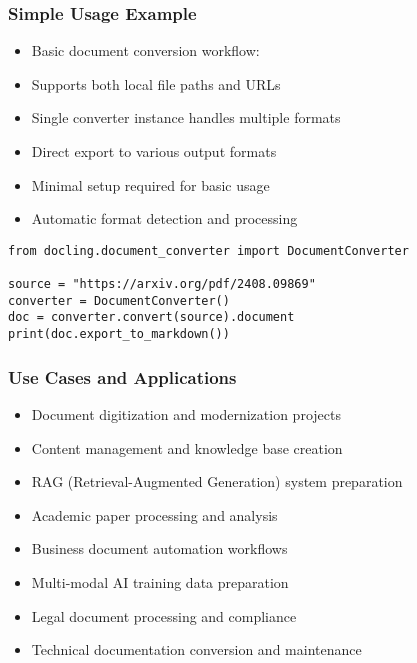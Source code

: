 \begin{frame}[fragile]\frametitle{Simple Usage Example}
      \begin{itemize}
	\item Basic document conversion workflow:
	\item Supports both local file paths and URLs
	\item Single converter instance handles multiple formats
	\item Direct export to various output formats
	\item Minimal setup required for basic usage
	\item Automatic format detection and processing
	  \end{itemize}
	  
\begin{lstlisting}
from docling.document_converter import DocumentConverter

source = "https://arxiv.org/pdf/2408.09869"
converter = DocumentConverter()
doc = converter.convert(source).document
print(doc.export_to_markdown())
\end{lstlisting}	  
\end{frame}

\begin{frame}[fragile]\frametitle{Use Cases and Applications}
      \begin{itemize}
	\item Document digitization and modernization projects
	\item Content management and knowledge base creation
	\item RAG (Retrieval-Augmented Generation) system preparation
	\item Academic paper processing and analysis
	\item Business document automation workflows
	\item Multi-modal AI training data preparation
	\item Legal document processing and compliance
	\item Technical documentation conversion and maintenance
	  \end{itemize}
\end{frame}

